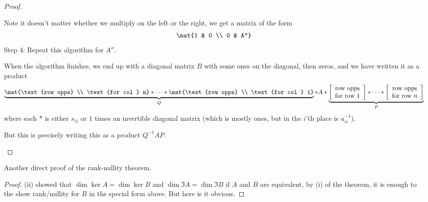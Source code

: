\begin{proof}
\begin{enumerate}
		Note it doesn't matter whether we multiply on the left or the right, we get a matrix of the form
		\begin{equation*}
			\mat{1 & 0 \\ 0 & A''}
		\end{equation*}
		Step 4: Repeat this algorithm for $A''$.

		When the algorithm finishes, we end up with a diagonal matrix $B$ with some ones on the diagonal, then zeros, and we have written it as	a product %
		\begin{equation*}
			\underbrace{
			\mat{\text{row opps} \\ \text{for col } n}
			* \cdots *
			\mat{\text{row opps} \\ \text{for col } 1}
			}_Q
			* A *
			\underbrace{
			\left[ \begin{array}{cc} \text{row opps} \\ \text{for row } 1 \end{array} \right]
			* \cdots *
			\left[ \begin{array}{cc} \text{row opps} \\ \text{for row } n \end{array} \right]
			}_P
		\end{equation*}
		where each $*$ is either $s_{ij}$ or $1$ times an invertible diagonal matrix (which is mostly ones, but in the $i$'th place is $a_{ii}^{-1}$). %

		But this is precisely writing this as a product $Q^{-1}AP$. \qedhere
	\end{enumerate}
\end{proof}

\begin{corollary}
	Another direct proof of the rank-nullity theorem. %
\end{corollary}

\begin{proof}
	(ii) showed that $\dim\ker A = \dim\ker B$ and $\dim\Im A = \dim\Im B$ if $A$ and $B$ are equivalent, by (i) of the theorem, it is enough to the show rank/nullity for $B$ in the special form above. But here is it obvious. %
\end{proof}


